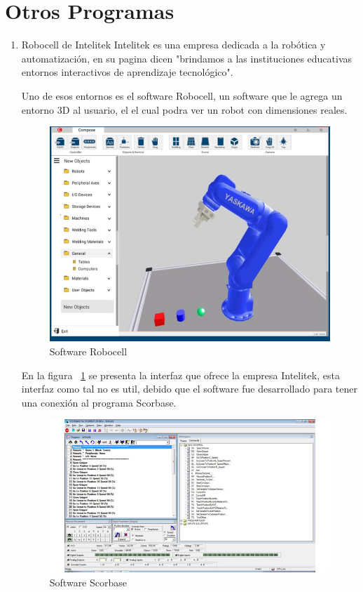 \section{Otros Programas}
\begin{enumerate}[label=\arabic*.-]
\item Robocell de Intelitek
Intelitek es una empresa dedicada a la robótica y automatización, en su pagina dicen "brindamos a las instituciones educativas entornos interactivos de aprendizaje tecnológico".

Uno de esos entornos es el software Robocell, un software que le agrega un entorno 3D al usuario, el el cual podra ver un robot con dimensiones reales.
\begin{figure}[h]
\centering
\includegraphics[width=13cm]{figures/Robocell-768x588-1.jpg}
\caption{Software Robocell}
\label{fig:robocell}
\end{figure}

En la figura ~\ref{fig:robocell} se presenta la interfaz que ofrece la empresa Intelitek, esta interfaz como tal no es util, debido que el software fue desarrollado para tener una conexión al programa Scorbase.
\clearpage

\begin{figure}[h]
\centering
\includegraphics[width=13cm]{figures/eL_RBTC_P_ScorbaseControllerUSBPro_644x350.jpg}
\caption{Software Scorbase}
\label{fig:scorbase}
\end{figure}


\end{enumerate}
